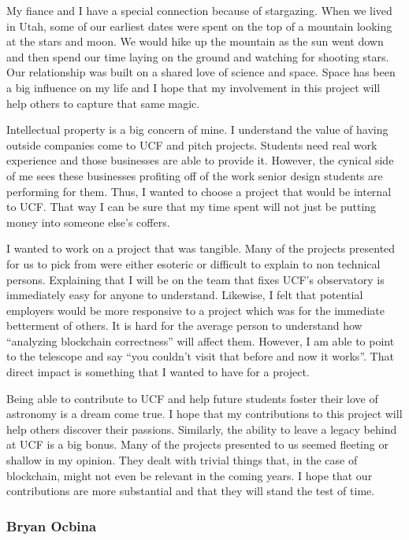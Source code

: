 \documentclass[12pt]{report}
\begin{document}
My fiance and I have a special connection because of stargazing. When we lived in Utah, some of our earliest dates were spent on the top of a mountain looking at the stars and moon. We would hike up the mountain as the sun went down and then spend our time laying on the ground and watching for shooting stars. Our relationship was built on a shared love of science and space. Space has been a big influence on my life and I hope that my involvement in this project will help others to capture that same magic.

Intellectual property is a big concern of mine. I understand the value of having outside companies come to UCF and pitch projects. Students need real work experience and those businesses are able to provide it. However, the cynical side of me sees these businesses profiting off of the work senior design students are performing for them. Thus, I wanted to choose a project that would be internal to UCF. That way I can be sure that my time spent will not just be putting money into someone else’s coffers.

I wanted to work on a project that was tangible. Many of the projects presented for us to pick from were either esoteric or difficult to explain to non technical persons. Explaining that I will be on the team that fixes UCF’s observatory is immediately easy for anyone to understand. Likewise, I felt that potential employers would be more responsive to a project which was for the immediate betterment of others. It is hard for the average person to understand how “analyzing blockchain correctness” will affect them. However, I am able to point to the telescope and say “you couldn’t visit that before and now it works”. That direct impact is something that I wanted to have for a project.

Being able to contribute to UCF and help future students foster their love of astronomy is a dream come true. I hope that my contributions to this project will help others discover their passions. Similarly, the ability to leave a legacy behind at UCF is a big bonus. Many of the projects presented to us seemed fleeting or shallow in my opinion. They dealt with trivial things that, in the case of blockchain, might not even be relevant in the coming years. I hope that our contributions are more substantial and that they will stand the test of time.

\subsubsection*{Bryan Ocbina}
\end{document}
